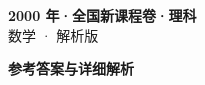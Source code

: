 \documentclass[zihao=-4, a4paper]{ctexart}
\begin{document}
\begin{center}
  {\Large\bfseries 2000 年·全国新课程卷·理科}\\[4pt]
  {\large 数学 · 解析版}
\end{center}
\medskip
{}

\clearpage
{}
\begin{center}{\Large\bfseries 参考答案与详细解析}\end{center}
\medskip

\end{document}
